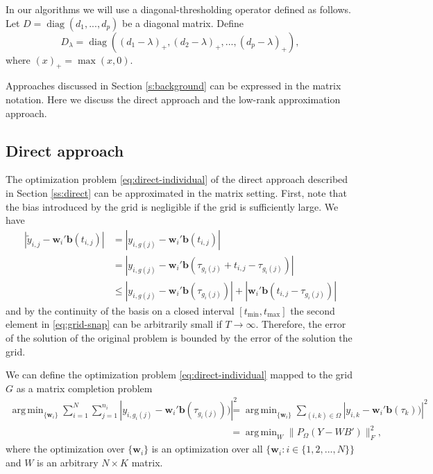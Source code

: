 \documentclass[preprint]{imsart}
\numberwithin{equation}{section}
\theoremstyle{plain}
\newcommand{\bb}{\mathbf{b}}
\newcommand{\bw}{\mathbf{w}}
\DeclareMathOperator*{\argmin}{arg\,min}
\DeclareMathOperator*{\diag}{diag}
\begin{document}
In our algorithms we will use a diagonal-thresholding operator defined as follows. Let $D = \diag(d_1,...,d_p)$ be a diagonal matrix. Define 
\begin{equation}
D_\lambda = \diag((d_1 - \lambda)_+,(d_2 - \lambda)_+,...,(d_p - \lambda)_+),\label{eq:thresholding}
\end{equation}
where $(x)_+ = \max(x, 0)$. 

Approaches discussed in Section \ref{s:background} can be expressed in the matrix notation. Here we discuss the direct approach and the low-rank approximation approach.

\subsection{Direct approach}

The optimization problem \eqref{eq:direct-individual} of the direct approach described in Section \ref{ss:direct} can be approximated in the matrix setting. First, note that the bias introduced by the grid is negligible if the grid is sufficiently large. We have
\begin{align}
  \left|\tilde y_{i,j} - \bw_i'\bb(t_{i,j})\right| &= \left|y_{i,g(j)} - \bw_i'\bb(t_{i,j})\right|\nonumber\\
  &= \left| y_{i,g(j)} - \bw_i' \bb(\tau_{g_i(j)} + t_{i,j} - \tau_{g_i(j)})\right|\nonumber\\
  &\leq \left| y_{i,g(j)} - \bw_i' \bb(\tau_{g_i(j)})\right| + \left|\bw_i' \bb(t_{i,j} - \tau_{g_i(j)})\right|\label{eq:grid-snap}
\end{align}
and by the continuity of the basis on a closed interval $[t_{\min},t_{\max}]$ the second element in \eqref{eq:grid-snap} can be arbitrarily small if $T \rightarrow \infty$. Therefore, the error of the solution of the original problem is bounded by the error of the solution the grid.

We can define the optimization problem \eqref{eq:direct-individual} mapped to the grid $G$ as a matrix completion problem
\begin{align}
 \argmin_{\{\bw_i\}}\sum_{i=1}^N \sum_{j=1}^{n_i}\left|y_{i,g_i(j)} - \bw_i' \bb(\tau_{g_i(j)}))\right|^2 &= \argmin_{\{\bw_i\}}\sum_{(i,k) \in \Omega}\left|y_{i,k} - \bw_i' \bb(\tau_{k}))\right|^2\nonumber\\
&= \argmin_W \| P_\Omega(Y - WB') \|_F^2,\label{eq:direct-matrix}
\end{align}
where the optimization over $\{\bw_i\}$ is an optimization over all $\{\bw_i : i \in \{ 1,2,...,N \}\}$ and $W$ is an arbitrary $N \times K$ matrix.
\end{document}
